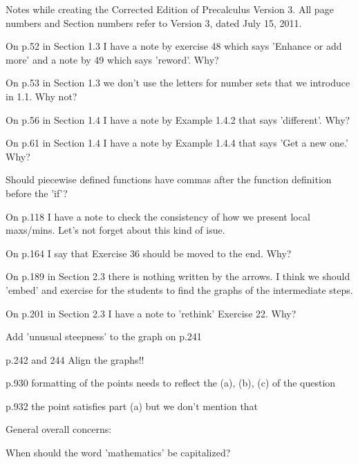 Notes while creating the Corrected Edition of Precalculus Version 3.  All page numbers and Section numbers refer to Version 3, dated July 15, 2011.

On p.52 in Section 1.3 I have a note by exercise 48 which says 'Enhance or add more' and a note by 49 which says 'reword'.  Why?

On p.53 in Section 1.3 we don't use the letters for number sets that we introduce in 1.1.  Why not?

On p.56 in Section 1.4 I have a note by Example 1.4.2 that says 'different'.  Why?

On p.61 in Section 1.4 I have a note by Example 1.4.4 that says 'Get a new one.'  Why?

Should piecewise defined functions have commas after the function definition before the 'if'?

On p.118 I have a note to check the consistency of how we present local maxs/mins.  Let's not forget about this kind of isue.

On p.164 I say that Exercise 36 should be moved to the end.  Why?

On p.189 in Section 2.3 there is nothing written by the arrows.  I think we should 'embed' and exercise for the students to find the graphs of the intermediate steps.

On p.201 in Section 2.3 I have a note to 'rethink' Exercise 22.  Why?

Add 'unusual steepness' to the graph on p.241

p.242 and 244 Align the graphs!!

p.930 formatting of the points needs to reflect the (a), (b), (c) of the question

p.932 the point satisfies part (a) but we don't mention that







General overall concerns:

When should the word 'mathematics' be capitalized?